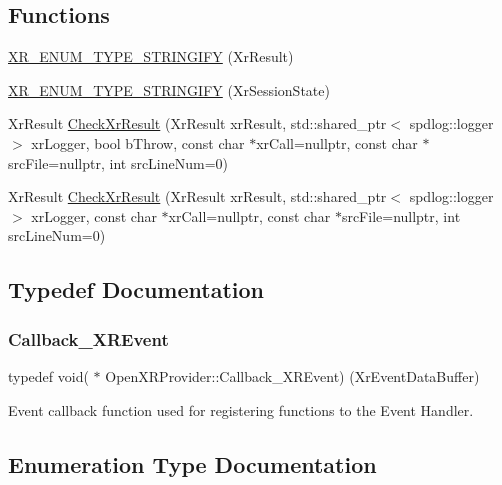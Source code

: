 \subsection*{Functions}
\begin{DoxyCompactItemize}
\item 
\mbox{\hyperlink{namespace_open_x_r_provider_ac8e3913afbac23d15ac8ade017abd1c2}{X\+R\+\_\+\+E\+N\+U\+M\+\_\+\+T\+Y\+P\+E\+\_\+\+S\+T\+R\+I\+N\+G\+I\+FY}} (Xr\+Result)
\item 
\mbox{\hyperlink{namespace_open_x_r_provider_a6f1b32985dfebfddc5f58fd4d9f520fd}{X\+R\+\_\+\+E\+N\+U\+M\+\_\+\+T\+Y\+P\+E\+\_\+\+S\+T\+R\+I\+N\+G\+I\+FY}} (Xr\+Session\+State)
\item 
Xr\+Result \mbox{\hyperlink{namespace_open_x_r_provider_a832e6cc66984ff274e355f5771a04f57}{Check\+Xr\+Result}} (Xr\+Result xr\+Result, std\+::shared\+\_\+ptr$<$ spdlog\+::logger $>$ xr\+Logger, bool b\+Throw, const char $\ast$xr\+Call=nullptr, const char $\ast$src\+File=nullptr, int src\+Line\+Num=0)
\item 
Xr\+Result \mbox{\hyperlink{namespace_open_x_r_provider_a9e6665bb283f00adb11c3c4ee57c05dd}{Check\+Xr\+Result}} (Xr\+Result xr\+Result, std\+::shared\+\_\+ptr$<$ spdlog\+::logger $>$ xr\+Logger, const char $\ast$xr\+Call=nullptr, const char $\ast$src\+File=nullptr, int src\+Line\+Num=0)
\end{DoxyCompactItemize}


\subsection{Typedef Documentation}
\mbox{\label{namespace_open_x_r_provider_a23b2e01bea1c0c0d762560792d8dff0f}} 
\subsubsection{\texorpdfstring{Callback\_XREvent}{Callback\_XREvent}}
{\footnotesize\ttfamily typedef void( $\ast$ Open\+X\+R\+Provider\+::\+Callback\+\_\+\+X\+R\+Event) (Xr\+Event\+Data\+Buffer)}



Event callback function used for registering functions to the Event Handler. 



\subsection{Enumeration Type Documentation}
\mbox{\label{namespace_open_x_r_provider_a8aa379869e30772896e6c468eb54f155}} 
